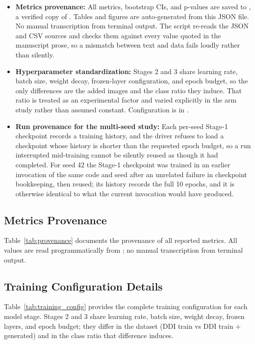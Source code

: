 \begin{itemize}
    \item \textbf{Metrics provenance:} All metrics, bootstrap CIs, and p-values are saved to , a verified copy of . Tables and figures are auto-generated from this JSON file. No manual transcription from terminal output. The script  re-reads the JSON and CSV sources and checks them against every value quoted in the manuscript prose, so a mismatch between text and data fails loudly rather than silently.
    \item \textbf{Hyperparameter standardization:} Stages 2 and 3 share learning rate, batch size, weight decay, frozen-layer configuration, and epoch budget, so the only differences are the added images and the class ratio they induce. That ratio is treated as an experimental factor and varied explicitly in the arm study rather than assumed constant. Configuration is in .
    \item \textbf{Run provenance for the multi-seed study:} Each per-seed Stage-1 checkpoint records a training history, and the driver refuses to load a checkpoint whose history is shorter than the requested epoch budget, so a run interrupted mid-training cannot be silently reused as though it had completed. For seed 42 the Stage-1 checkpoint was trained in an earlier invocation of the same code and seed after an unrelated failure in checkpoint bookkeeping, then reused; its history records the full 10 epochs, and it is otherwise identical to what the current invocation would have produced.
\end{itemize}

\subsection{Metrics Provenance}

Table~\ref{tab:provenance} documents the provenance of all reported metrics. All values are read programmatically from ; no manual transcription from terminal output.

\subsection{Training Configuration Details}

Table~\ref{tab:training_config} provides the complete training configuration for each model stage. Stages 2 and 3 share learning rate, batch size, weight decay, frozen layers, and epoch budget; they differ in the dataset (DDI train vs DDI train $+$ generated) and in the class ratio that difference induces.

